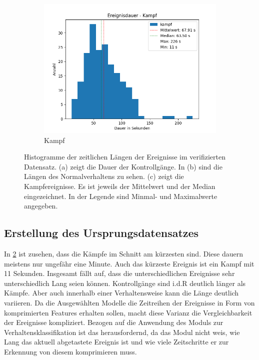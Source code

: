 \begin{figure}[htbp]
    \begin{subfigure}{.6\textwidth}
        \centering
        \includegraphics[width=1\linewidth]{img//Ereignisdauer/Auswertung Ereignisdauer kampf.png}
        \caption{Kampf}
        \label{fig:DauerNormal}
    \end{subfigure}
    \caption{Histogramme der zeitlichen Längen der Ereignisse im verifizierten Datensatz. (a) zeigt die Dauer der Kontrollgänge. In (b) sind die Längen des Normalverhaltens zu sehen. (c) zeigt die Kampfereignisse. Es ist jeweils der Mittelwert und der Median eingezeichnet. In der Legende sind Minmal- und Maximalwerte angegeben.}
    \label{fig:EreignisDauer}
\end{figure}

\subsection{Erstellung des Ursprungsdatensatzes}
In \ref{fig:EreignisDauer} ist zusehen, dass die Kämpfe im Schnitt am kürzesten sind. Diese dauern meistens nur ungefähr eine Minute. Auch das kürzeste Ereignis ist ein Kampf mit 11 Sekunden. Insgesamt fällt auf, dass die unterschiedlichen Ereignisse sehr unterschiedlich Lang seien können. Kontrollgänge sind i.d.R deutlich länger als Kämpfe. Aber auch innerhalb einer Verhaltensweise kann die Länge deutlich variieren. Da die Ausgewählten Modelle die Zeitreihen der Ereignisse in Form von komprimierten Features erhalten sollen, macht diese Varianz die Vergleichbarkeit der Ereignisse kompliziert. Bezogen auf die Anwendung des Moduls zur Verhaltensklassifikation ist das herausfordernd, da das Modul nicht weis, wie Lang das aktuell abgetastete Ereignis ist und wie viele Zeitschritte er zur Erkennung von diesem komprimieren muss. \par

